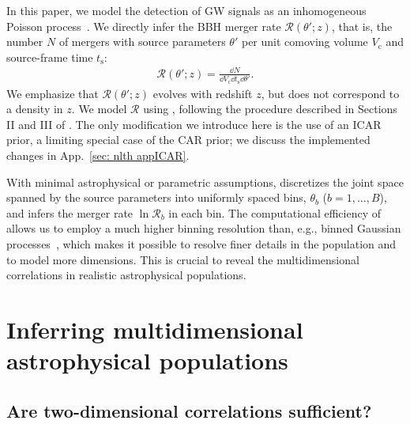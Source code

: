 \begin{refsection}
In this paper, we model the detection of \ac{GW} signals as an inhomogeneous Poisson process~\citep{Mandel:2018mve,Thrane:2018qnx,Vitale:2020aaz,Essick:2023upv}. We directly infer the \ac{BBH} merger rate $\mathcal{R}(\theta';z)$, that is, the number $N$ of mergers with source parameters $\theta'$ per unit comoving volume $V_\mathrm{c}$ and source-frame time $t_\mathrm{s}$:
\begin{align}
\label{eq:source-frame-rate}
\mathcal{R} ( \theta' ; z )
=
\frac
{ \dd{N} }
{ \dd{V_\mathrm{c}} \dd{t_\mathrm{s}} \dd{\theta'} }.
\end{align}
We emphasize that $\mathcal{R}(\theta';z)$ evolves with redshift $z$, but does not correspond to a density in $z$. We model $\mathcal{R}$ using \PixelPop, following the procedure described in Sections II and III of \citet{Heinzel:2024jlc}. The only modification we introduce here is the use of an \ac{ICAR} prior, a limiting special case of the \ac{CAR} prior; we discuss the implemented changes in App.~\ref{sec: nlth appICAR}.

With minimal astrophysical or parametric assumptions, \PixelPop discretizes the joint space spanned by the source parameters into uniformly spaced bins, $\theta_b$ ($b = 1,\ldots,B$), and infers the merger rate $\ln\mathcal{R}_b$ in each bin. The computational efficiency of \PixelPop allows us to employ a much higher binning resolution than, e.g., binned Gaussian processes~\citep{Ray:2023upk,KAGRA:2021duu}, which makes it possible to resolve finer details in the population and to model more dimensions. This is crucial to reveal the multidimensional correlations in realistic astrophysical populations.


\section{Inferring multidimensional astrophysical populations}
\label{sec: nlth results}

\subsection{Are two-dimensional correlations sufficient?}
\label{sec: nlth 2d-inference}


\end{refsection}
